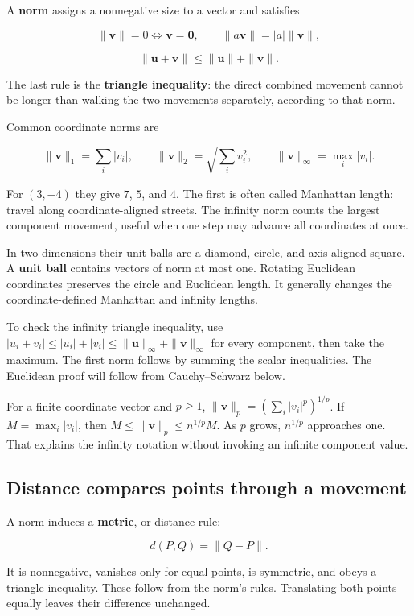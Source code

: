 A \textbf{norm} assigns a nonnegative size to a vector and satisfies

\[
\|\mathbf v\|=0\iff\mathbf v=\mathbf0,\qquad
\|a\mathbf v\|=|a|\|\mathbf v\|,
\]

\[
\|\mathbf u+\mathbf v\|\le\|\mathbf u\|+\|\mathbf v\|.
\]

The last rule is the \textbf{triangle inequality}: the direct combined movement cannot be longer than walking the two movements separately, according to that norm.

Common coordinate norms are

\[
\|\mathbf v\|_1=\sum_i|v_i|,\qquad
\|\mathbf v\|_2=\sqrt{\sum_iv_i^2},\qquad
\|\mathbf v\|_\infty=\max_i|v_i|.
\]

For \((3,-4)\) they give \(7\), \(5\), and \(4\). The first is often called Manhattan length: travel along coordinate-aligned streets. The infinity norm counts the largest component movement, useful when one step may advance all coordinates at once.

In two dimensions their unit balls are a diamond, circle, and axis-aligned square. A \textbf{unit ball} contains vectors of norm at most one. Rotating Euclidean coordinates preserves the circle and Euclidean length. It generally changes the coordinate-defined Manhattan and infinity lengths.

To check the infinity triangle inequality, use \(|u_i+v_i|\le|u_i|+|v_i|\le\|\mathbf u\|_\infty+\|\mathbf v\|_\infty\) for every component, then take the maximum. The first norm follows by summing the scalar inequalities. The Euclidean proof will follow from Cauchy--Schwarz below.

For a finite coordinate vector and \(p\ge1\), \(\|\mathbf v\|_p=(\sum_i|v_i|^p)^{1/p}\). If \(M=\max_i|v_i|\), then \(M\le\|\mathbf v\|_p\le n^{1/p}M\). As \(p\) grows, \(n^{1/p}\) approaches one. That explains the infinity notation without invoking an infinite component value.

\subsection{Distance compares points through a movement}\label{01-foundations-i-ch017-distance-compares-points-through-a-movement}

A norm induces a \textbf{metric}, or distance rule:

\[
d(P,Q)=\|Q-P\|.
\]

It is nonnegative, vanishes only for equal points, is symmetric, and obeys a triangle inequality. These follow from the norm's rules. Translating both points equally leaves their difference unchanged.

